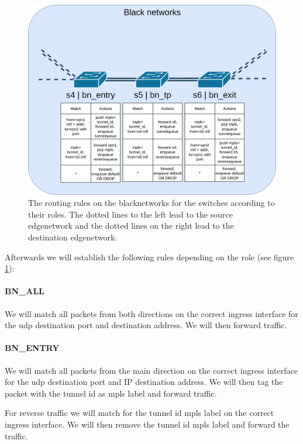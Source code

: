 \begin{figure}[ht]
    \centering
    \includegraphics[width=\linewidth]{images/chapter_6/routing_bn.png}
    \caption[Routing on the \gls{blacknetwork}s]{The routing rules on the \gls{blacknetwork}s for the switches according to their roles. The dotted lines to the left lead to the source \gls{edgenetwork} and the dotted lines on the right lead to the destination \gls{edgenetwork}.}
    \label{fig:routing_bn}
\end{figure}

Afterwards we will establish the following rules depending on the role (see figure \ref{fig:routing_bn}):

\paragraph{BN\_ALL} We will match all packets from both directions on the correct ingress interface for the \acrshort{udp} destination port and destination address. We will then forward traffic.

\paragraph{BN\_ENTRY} We will match all packets from the main direction on the correct ingress interface for the \acrshort{udp} destination port and IP destination address. We will then tag the packet with the tunnel id as \acrshort{mpls} label and forward traffic.

For reverse traffic we will match for the tunnel id \acrshort{mpls} label on the correct ingress interface. We will then remove the tunnel id \acrshort{mpls} label and forward the traffic.


